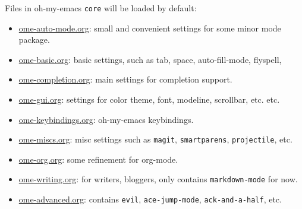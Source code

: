 \documentclass[11pt]{article}
\begin{document}
Files in oh-my-emacs \texttt{core} will be loaded by default:
\begin{itemize}
\item \href{core/ome-auto-mode.org}{ome-auto-mode.org}: small and convenient settings for some minor mode package.
\item \href{core/ome-basic.org}{ome-basic.org}: basic settings, such as tab, space, auto-fill-mode, flyspell,
\item \href{core/ome-completion.org}{ome-completion.org}: main settings for completion support.
\item \href{core/ome-gui.org}{ome-gui.org}: settings for color theme, font, modeline, scrollbar, etc.
etc.
\item \href{core/ome-keybindings.org}{ome-keybindings.org}: oh-my-emacs keybindings.
\item \href{core/ome-miscs.org}{ome-miscs.org}: misc settings such as \texttt{magit}, \texttt{smartparens}, \texttt{projectile},
etc.
\item \href{core/ome-org.org}{ome-org.org}: some refinement for org-mode.
\item \href{core/ome-writing.org}{ome-writing.org}: for writers, bloggers, only contains \texttt{markdown-mode} for
now.
\item \href{core/ome-advanced.org}{ome-advanced.org}: contains \texttt{evil}, \texttt{ace-jump-mode}, \texttt{ack-and-a-half}, etc.
\end{itemize}
\end{document}
